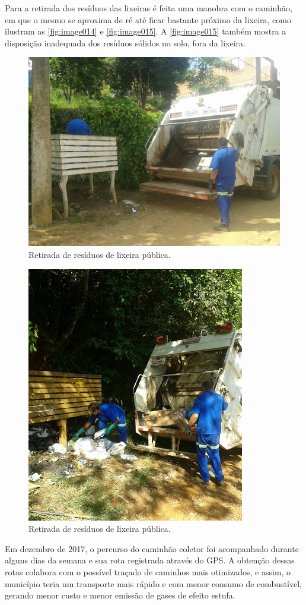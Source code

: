 Para a retirada dos resíduos das lixeiras é feita uma manobra com o caminhão, em que o mesmo se aproxima de ré até ficar bastante próximo da lixeira, como ilustram as \autoref{fig:image014} e \autoref{fig:image015}. A \autoref{fig:image015} também mostra a disposição inadequada dos resíduos sólidos no solo, fora da lixeira.

\begin{figure}
	\centering
	\includegraphics[width=0.7\linewidth]{produtos/prodtres/image014}
	\caption{Retirada de resíduos de lixeira pública.}
	\label{fig:image014}
\end{figure}

\begin{figure}
	\centering
	\includegraphics[width=0.50\linewidth]{produtos/prodtres/image015}
	\caption{Retirada de resíduos de lixeira pública.}
	\label{fig:image015}
\end{figure}

Em dezembro de 2017, o percurso do caminhão coletor foi acompanhado durante alguns dias da semana e sua rota registrada através do GPS. A obtenção dessas rotas colabora com o possível traçado de caminhos mais otimizados, e assim, o município teria um transporte mais rápido e com menor consumo de combustível, gerando menor custo e menor emissão de gases de efeito estufa.

